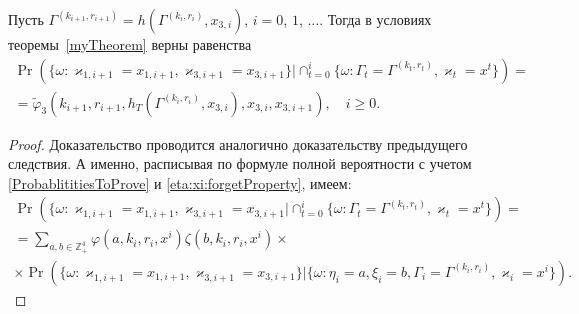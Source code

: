 \documentclass[a4paper,12pt,russian]{extarticle}
\begin{document}
\begin{corollary}
Пусть $\Gamma^{(k_{i+1},r_{i+1})}=h(\Gamma^{(k_i,r_i)},x_{3,i})$, $i=0$, $1$, $\ldots$. Тогда в условиях теоремы~\ref{myTheorem} верны равенства
\begin{multline}
\Pr (\{ \omega \colon \varkappa_{1,i+1} = x_{1,i+1}, \varkappa_{3,i+1} = x_{3,i+1}\} |\cap_{t=0}^{i}\{\omega\colon \Gamma_t=\Gamma^{(k_t,r_t)}, \varkappa_t=x^t\})=\\
=\widetilde{\varphi}_3(k_{i+1},r_{i+1},h_T(\Gamma^{(k_i,r_i)},x_{3,i}),x_{3,i},x_{3,i+1}), \quad i \geqslant 0.
\label{kappa:1:kappa:3:conditional}
\end{multline}
\end{corollary}
\begin{proof}
Доказательство проводится аналогично доказательству предыдущего следствия. А именно, расписывая по формуле полной вероятности с учетом \eqref{ProbablititiesToProve} и \eqref{eta:xi:forgetProperty}, имеем:
\begin{multline*}
\Pr (\{ \omega \colon \varkappa_{1,i+1} = x_{1,i+1}, \varkappa_{3,i+1} = x_{3,i+1} |\cap_{t=0}^{i}\{\omega\colon \Gamma_t=\Gamma^{(k_t,r_t)}, \varkappa_t=x^t\}) =\\
=\sum_{a,b\in \mathbb{Z}_+^4} \varphi(a,k_i,r_i,x^i)\zeta(b,k_i,r_i,x^i) \times\\
\times \Pr (\{ \omega \colon \varkappa_{1,i+1} = x_{1,i+1}, \varkappa_{3,i+1} = x_{3,i+1}\} |\{\omega\colon \eta_i=a, \xi_i=b, \Gamma_i=\Gamma^{(k_i,r_i)}, \varkappa_i=x^i\}).
\end{multline*}



\end{proof}
\end{document}
